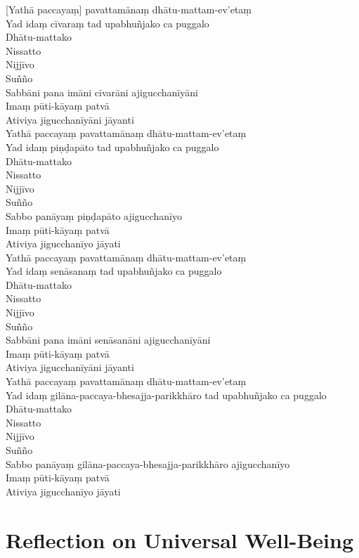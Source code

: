 [Yathā paccayaṃ] pavattamānaṃ dhātu-mattam-ev'etaṃ\\
Yad idaṃ cīvaraṃ tad upabhuñjako ca puggalo\\
Dhātu-mattako\\
Nissatto\\
Nijjīvo\\
Suñño\\
Sabbāni pana imāni cīvarāni ajigucchanīyāni\\
Imaṃ pūti-kāyaṃ patvā\\
Ativiya jigucchanīyāni jāyanti\\
Yathā paccayaṃ pavattamānaṃ dhātu-mattam-ev'etaṃ\\
Yad idaṃ piṇḍapāto tad upabhuñjako ca puggalo\\
Dhātu-mattako\\
Nissatto\\
Nijjīvo\\
Suñño\\
Sabbo panāyaṃ piṇḍapāto ajigucchanīyo\\
Imaṃ pūti-kāyaṃ patvā\\
Ativiya jigucchanīyo jāyati\\
Yathā paccayaṃ pavattamānaṃ dhātu-mattam-ev'etaṃ\\
Yad idaṃ senāsanaṃ tad upabhuñjako ca puggalo\\
Dhātu-mattako\\
Nissatto\\
Nijjīvo\\
Suñño\\
Sabbāni pana imāni senāsanāni ajigucchanīyāni\\
Imaṃ pūti-kāyaṃ patvā\\
Ativiya jigucchanīyāni jāyanti\\
Yathā paccayaṃ pavattamānaṃ dhātu-mattam-ev'etaṃ\\
Yad idaṃ gilāna-paccaya-bhesajja-parikkhāro tad upabhuñjako ca puggalo\\
Dhātu-mattako\\
Nissatto\\
Nijjīvo\\
Suñño\\
Sabbo panāyaṃ gilāna-paccaya-bhesajja-parikkhāro ajigucchanīyo\\
Imaṃ pūti-kāyaṃ patvā\\
Ativiya jigucchanīyo jāyati

\chapter{Reflection on Universal Well-Being}


